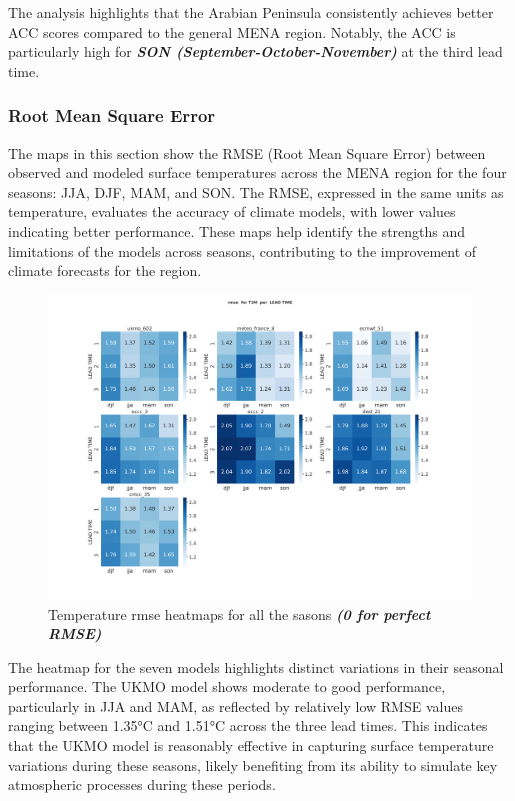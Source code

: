 The analysis highlights that the Arabian Peninsula consistently achieves better ACC scores compared to the general MENA region. Notably, the ACC is particularly high for \textbf{\textit{SON (September-October-November)}} at the third lead time.
\subsubsection{Root Mean Square Error}


The maps in this section show the RMSE (Root Mean Square Error) between observed and modeled surface temperatures across the MENA region for the four seasons: JJA, DJF, MAM, and SON. The RMSE, expressed in the same units as temperature, evaluates the accuracy of climate models, with lower values indicating better performance.  These maps help identify the strengths and limitations of the models across seasons, contributing to the improvement of climate forecasts for the region.
\begin{figure}[H]
    \centering
    \includegraphics[width=1\linewidth]{plots/det/rmse/rmse_T2M.png}
    \caption{Temperature rmse heatmaps for all the sasons \textbf{\textit{(0 for perfect RMSE)} }}
\end{figure}

The heatmap for the seven models highlights distinct variations in their seasonal performance. The UKMO model shows moderate to good performance, particularly in JJA and MAM, as reflected by relatively low RMSE values ranging between 1.35°C and 1.51°C across the three lead times. This indicates that the UKMO model is reasonably effective in capturing surface temperature variations during these seasons, likely benefiting from its ability to simulate key atmospheric processes during these periods.

